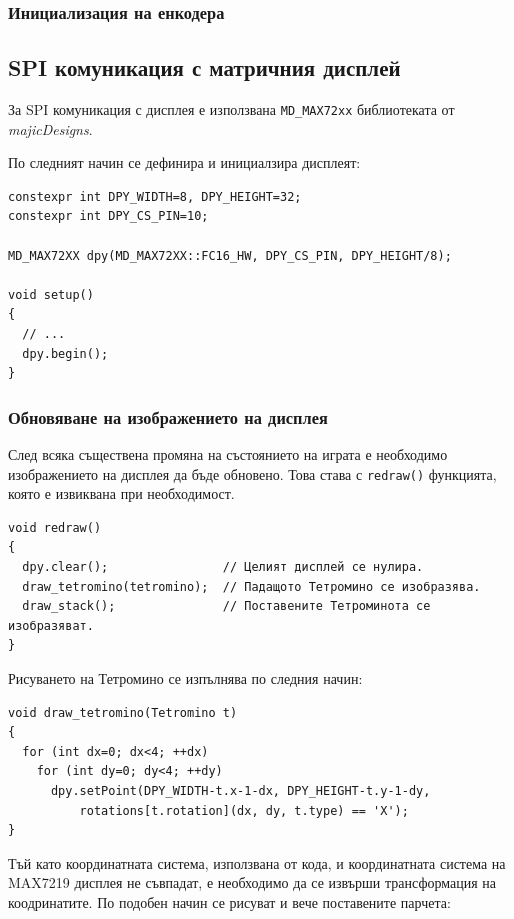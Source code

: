 \documentclass[titlepage, oneside, 12pt]{book}
\begin{document}
\subsubsection{Инициализация на енкодера}

\subsection{SPI комуникация с матричния дисплей}

За SPI комуникация с дисплея е използвана \texttt{MD_MAX72xx} библиотеката от \textit{majicDesigns}.

По следният начин се дефинира и инициалзира дисплеят:

\begin{verbatim}
constexpr int DPY_WIDTH=8, DPY_HEIGHT=32;
constexpr int DPY_CS_PIN=10;

MD_MAX72XX dpy(MD_MAX72XX::FC16_HW, DPY_CS_PIN, DPY_HEIGHT/8);

void setup()
{
  // ...
  dpy.begin();
}
\end{verbatim}

\subsubsection{Обновяване на изображението на дисплея}

След всяка съществена промяна на състоянието на играта е необходимо изображението на дисплея да бъде обновено.
Това става с \texttt{redraw()} функцията, която е извиквана при необходимост.

\begin{verbatim}
void redraw()
{
  dpy.clear();                // Целият дисплей се нулира.
  draw_tetromino(tetromino);  // Падащото Тетромино се изобразява.
  draw_stack();               // Поставените Тетроминота се изобразяват.
}
\end{verbatim}

Рисуването на Тетромино се изпълнява по следния начин:

\begin{verbatim}
void draw_tetromino(Tetromino t)
{
  for (int dx=0; dx<4; ++dx)
    for (int dy=0; dy<4; ++dy)
      dpy.setPoint(DPY_WIDTH-t.x-1-dx, DPY_HEIGHT-t.y-1-dy,
          rotations[t.rotation](dx, dy, t.type) == 'X');
}
\end{verbatim}

Тъй като координатната система, използвана от кода, и координатната система на MAX7219 дисплея не съвпадат,
е необходимо да се извърши трансформация на коодринатите. По подобен начин се рисуват и вече поставените парчета:
\end{document}
